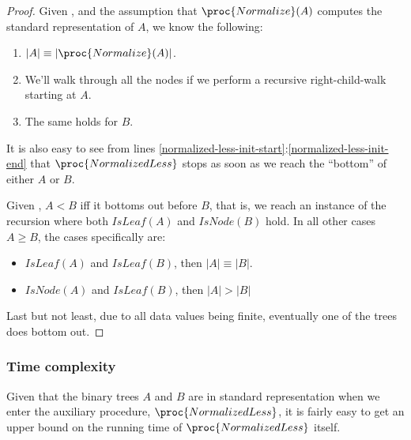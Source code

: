 \begin{proof}

Given , and the assumption that
$\proc{Normalize}(A)$ computes the standard representation of $A$, we know the
following:

\begin{enumerate}

\item $\left|A\right|\equiv\left|\proc{Normalize}(A)\right|$.

\item We'll walk through all the nodes if we perform a recursive
right-child-walk starting at $A$.

\item The same holds for $B$.

\end{enumerate}

It is also easy to see from lines
\ref{normalized-less-init-start}:\ref{normalized-less-init-end} that
$\proc{NormalizedLess}$ stops as soon as we reach the ``bottom'' of either $A$
or $B$.

Given , $A<B$ iff it bottoms out before $B$, that is,
we reach an instance of the recursion where both $IsLeaf(A)$ and $IsNode(B)$
hold.  In all other cases $A\geq B$, the cases specifically are:

\begin{itemize}

\item $IsLeaf(A)$ and $IsLeaf(B)$, then $\left|A\right|\equiv \left|B\right|$.

\item $IsNode(A)$ and $IsLeaf(B)$, then $\left|A\right|>\left|B\right|$

\end{itemize}

Last but not least, due to all data values being finite, eventually one of the
trees does bottom out.

\end{proof}

\subsubsection{Time complexity}

Given that the binary trees $A$ and $B$ are in standard representation when we
enter the auxiliary procedure, $\proc{NormalizedLess}$, it is fairly easy to
get an upper bound on the running time of $\proc{NormalizedLess}$ itself.


